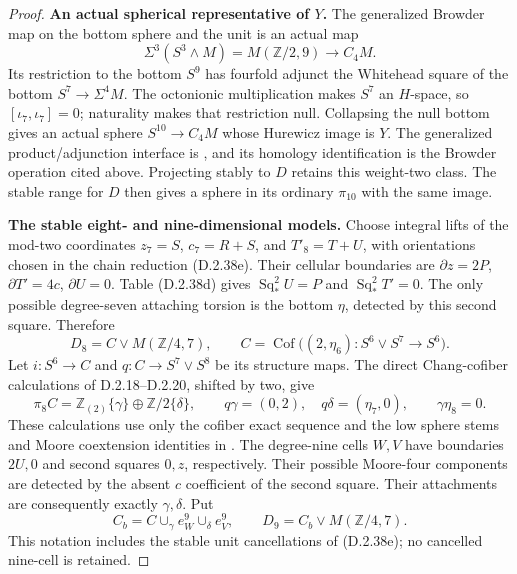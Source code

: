 \begin{proof}
\medskip\noindent
\textbf{An actual spherical representative of $Y$.}
The generalized Browder map on the bottom sphere and the unit is
an actual map
\[
 \Sigma^3(S^3\wedge M)=M(\mathbb Z/2,9)\longrightarrow C_4M.
 \tag{D.2.38f}
\]
Its restriction to the bottom $S^9$ has fourfold adjunct the
Whitehead square of the bottom $S^7\to\Sigma^4M$.
The octonionic multiplication makes $S^7$ an $H$-space, so
$[\iota_7,\iota_7]=0$; naturality makes that restriction null.
Collapsing the null bottom gives an actual sphere $S^{10}\to C_4M$
whose Hurewicz image is $Y$.  The generalized product/adjunction
interface is \cite[Definitions~2.2--2.3 and
Theorem~2.4]{EH5Arkowitz1962}, and its homology identification is
the Browder operation cited above.  Projecting stably to $D$
retains this weight-two class.  The stable range for $D$ then
gives a sphere in its ordinary $\pi_{10}$ with the same image.

\medskip\noindent
\textbf{The stable eight- and nine-dimensional models.}
Choose integral lifts of the mod-two coordinates
$z_7=S$, $c_7=R+S$, and $T'_8=T+U$, with orientations
chosen in the chain reduction \textup{(D.2.38e)}.
Their cellular boundaries are
$\partial z=2P$, $\partial T'=4c$, $\partial U=0$.
Table \textup{(D.2.38d)} gives
$\operatorname{Sq}_*^2 U=P$ and
$\operatorname{Sq}_*^2 T'=0$.
The only possible degree-seven attaching torsion is the bottom
$\eta$, detected by this second square.  Therefore
\[
 D_8=C\vee M(\mathbb Z/4,7),\qquad
 C=\operatorname{Cof}\bigl((2,\eta_6):S^6\vee S^7\to S^6\bigr).
 \tag{D.2.38g}
\]
Let $i:S^6\to C$ and $q:C\to S^7\vee S^8$ be its structure maps.
The direct Chang-cofiber calculations of D.2.18--D.2.20,
shifted by two, give
\[
 \pi_8 C=\mathbb Z_{(2)}\{\gamma\}\oplus\mathbb Z/2\{\delta\},
 \qquad q\gamma=(0,2),\quad q\delta=(\eta_7,0),
 \qquad \gamma\eta_8=0.
 \tag{D.2.38h}
\]
These calculations use only the cofiber exact sequence and
the low sphere stems and Moore coextension identities in
\cite[Section~2, equations~(2.1)--(2.2), p.~149]{I_Oka1986}.
The degree-nine cells $W,V$ have boundaries $2U,0$ and
second squares $0,z$, respectively.  Their possible Moore-four
components are detected by the absent $c$ coefficient of the
second square.  Their attachments are consequently exactly
$\gamma,\delta$.  Put
\[
 C_b=C\cup_\gamma e^9_W\cup_\delta e^9_V,
 \qquad D_9=C_b\vee M(\mathbb Z/4,7).
 \tag{D.2.38i}
\]
This notation includes the stable unit cancellations of
\textup{(D.2.38e)}; no cancelled nine-cell is retained.


\end{proof}
